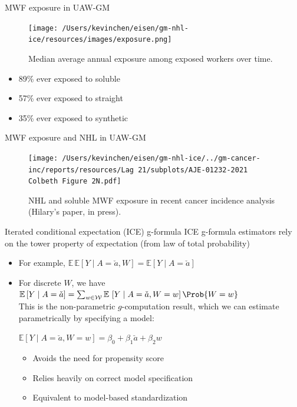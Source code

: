 \documentclass[
  11pt,
  ignorenonframetext,
]{beamer}
\providecommand{\tightlist}{%
  \setlength{\itemsep}{0pt}\setlength{\parskip}{0pt}}
\begin{document}
\begin{frame}{MWF exposure in UAW-GM}
\protect\hypertarget{mwf-exposure-in-uaw-gm}{}
\begin{figure}
\centering
\texttt{[image: /Users/kevinchen/eisen/gm-nhl-ice/resources/images/exposure.png]}
\caption{Median average annual exposure among exposed workers over
time.}
\end{figure}

\begin{itemize}
\tightlist
\item
  89\% ever exposed to soluble
\item
  57\% ever exposed to straight
\item
  35\% ever exposed to synthetic
\end{itemize}
\end{frame}

\begin{frame}{MWF exposure and NHL in UAW-GM}
\protect\hypertarget{mwf-exposure-and-nhl-in-uaw-gm}{}
\begin{figure}
\centering
\texttt{[image: /Users/kevinchen/eisen/gm-nhl-ice/../gm-cancer-inc/reports/resources/Lag 21/subplots/AJE-01232-2021 Colbeth Figure 2N.pdf]}
\caption{NHL and soluble MWF exposure in recent cancer incidence
analysis (Hilary's paper, in press).}
\end{figure}
\end{frame}

\begin{frame}{Iterated conditional expectation (ICE) g-formula}
\protect\hypertarget{iterated-conditional-expectation-ice-g-formula}{}
ICE g-formula estimators rely on the tower property of expectation (from
law of total probability)

\begin{itemize}
\tightlist
\item
  For example,
  \(\mathbb E\, \mathbb E \left[Y \mid A = \check{a}, W \right] = \mathbb E \left[Y \mid A = \check{a}\right]\)
\item
  For discrete \(W\), we have\\
  \(\mathbb E \left[Y \mid A = \check{a}\right] = \sum_{w \in \mathcal W} \mathbb E\, \left[Y \mid A = \check{a}, W = w\right] \Prob{W = w}\)\\
  This is the non-parametric \(g\)-computation result, which we can
  estimate parametrically by specifying a model:

  \begin{center}$\mathbb E\left[Y \mid A = \check{a}, W = w\right] = \beta_0 + \beta_1 \check{a} + \beta_2 w$\end{center}

  \begin{itemize}
  \tightlist
  \item
    Avoids the need for propensity score
  \item
    Relies heavily on correct model specification
  \item
    Equivalent to model-based standardization
  \end{itemize}
\end{itemize}
\end{frame}
\end{document}
